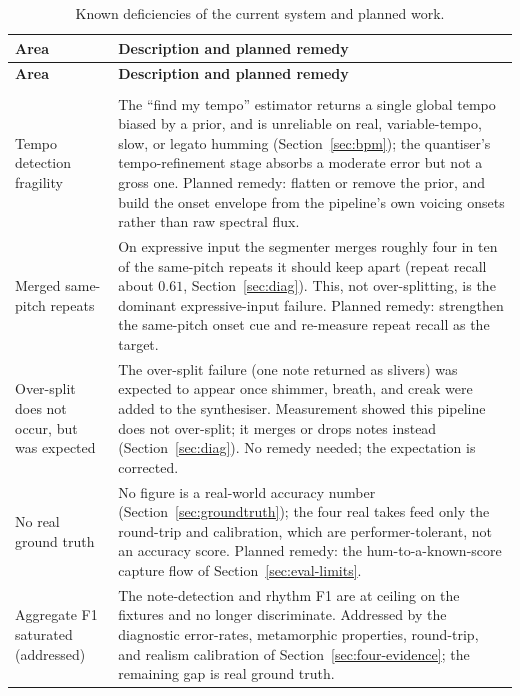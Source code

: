 \documentclass[12pt,a4paper]{article}
\begin{document}
\begin{longtable}{>{\raggedright\arraybackslash}p{} >{\raggedright\arraybackslash}p{}}
\caption{Known deficiencies of the current system and planned work.}
\label{tab:deficiencies} \\
\toprule
\textbf{Area} & \textbf{Description and planned remedy} \\
\midrule
\endfirsthead
\toprule
\textbf{Area} & \textbf{Description and planned remedy} \\
\midrule
\endhead
\midrule
\multicolumn{2}{r}{\footnotesize\itshape Continued on the next page.} \\
\endfoot
\bottomrule
\endlastfoot
Tempo detection fragility & The ``find my tempo'' estimator returns a single
global tempo biased by a prior, and is unreliable on real, variable-tempo,
slow, or legato humming (Section~\ref{sec:bpm}); the quantiser's tempo-refinement
stage absorbs a moderate error but not a gross one. Planned remedy: flatten or
remove the prior, and build the onset envelope from the pipeline's own voicing
onsets rather than raw spectral flux. \\
\addlinespace
Merged same-pitch repeats & On expressive input the segmenter merges roughly four
in ten of the same-pitch repeats it should keep apart (repeat recall about $0.61$,
Section~\ref{sec:diag}). This, not over-splitting, is the dominant expressive-input
failure. Planned remedy: strengthen the same-pitch onset cue and re-measure repeat
recall as the target. \\
\addlinespace
Over-split does not occur, but was expected & The over-split failure (one note
returned as slivers) was expected to appear once shimmer, breath, and creak were
added to the synthesiser. Measurement showed this pipeline does not over-split; it
merges or drops notes instead (Section~\ref{sec:diag}). No remedy needed; the
expectation is corrected. \\
\addlinespace
No real ground truth & No figure is a real-world accuracy number
(Section~\ref{sec:groundtruth}); the four real takes feed only the round-trip and
calibration, which are performer-tolerant, not an accuracy score. Planned remedy:
the hum-to-a-known-score capture flow of Section~\ref{sec:eval-limits}. \\
\addlinespace
Aggregate F1 saturated (addressed) & The note-detection and rhythm F1 are at
ceiling on the fixtures and no longer discriminate. Addressed by the diagnostic
error-rates, metamorphic properties, round-trip, and realism calibration of
Section~\ref{sec:four-evidence}; the remaining gap is real ground truth. \\

\end{longtable}
\end{document}
